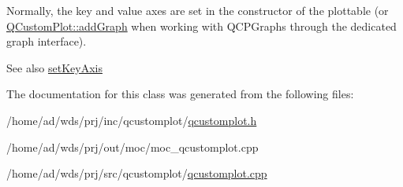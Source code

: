 Normally, the key and value axes are set in the constructor of the plottable (or \hyperlink{class_q_custom_plot_a6fb2873d35a8a8089842d81a70a54167}{Q\+Custom\+Plot\+::add\+Graph} when working with Q\+C\+P\+Graphs through the dedicated graph interface).

\begin{DoxySeeAlso}{See also}
\hyperlink{class_q_c_p_abstract_plottable_a8524fa2994c63c0913ebd9bb2ffa3920}{set\+Key\+Axis} 
\end{DoxySeeAlso}


The documentation for this class was generated from the following files\+:\begin{DoxyCompactItemize}
\item 
/home/ad/wds/prj/inc/qcustomplot/\hyperlink{qcustomplot_8h}{qcustomplot.\+h}\item 
/home/ad/wds/prj/out/moc/moc\+\_\+qcustomplot.\+cpp\item 
/home/ad/wds/prj/src/qcustomplot/\hyperlink{qcustomplot_8cpp}{qcustomplot.\+cpp}\end{DoxyCompactItemize}
